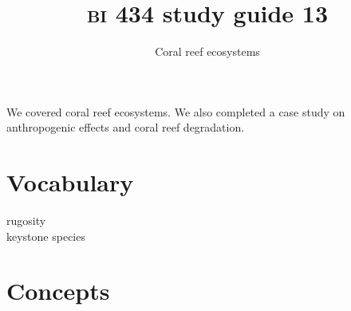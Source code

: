 \documentclass[letterpaper]{tufte-handout}
\title{{\scshape bi} 434 study guide 13}
\author{Coral reef ecosystems}
\date{} %
\begin{document}
\maketitle	%


We covered coral reef ecosystems. We also completed a case study on anthropogenic effects and coral reef degradation.

\section*{Vocabulary}
\begin{multicols}{2}
rugosity\\
keystone species
\end{multicols}
\section*{Concepts}
\end{document}
